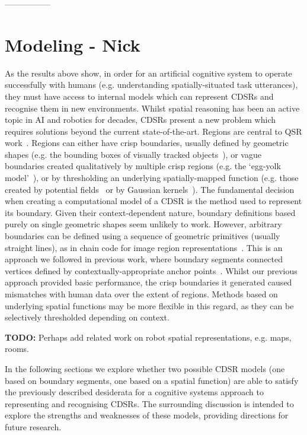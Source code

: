 \documentclass[11pt,letterpaper]{article}
\begin{document}
-----------------
 




\section{Modeling - Nick}


As the results above show, in order for an artificial cognitive system to operate successfully with humans (e.g. understanding spatially-situated task utterances), they must have access to internal models which can represent CDSRs and recognise them in new environments. Whilst spatial reasoning has been an active topic in AI and robotics for decades, CDSRs present a new problem which requires solutions beyond the current state-of-the-art. Regions are central to QSR work~\cite{Cohn:2001}. Regions can either have crisp boundaries, usually defined by geometric shapes (e.g. the bounding boxes of visually tracked objects~\cite{SridharCohn:10}), or vague boundaries created qualitatively by multiple crisp regions (e.g. the `egg-yolk model'~\cite{Cohn96b}), or by thresholding an underlying spatially-mapped function (e.g. those created by potential fields~\cite{brenneretal07ijcai} or by Gaussian kernels~\cite{burbridge-dearden12}). The fundamental decision when creating a computational model of a CDSR is the method used to represent its boundary. Given their context-dependent nature, boundary definitions based purely on single geometric shapes seem unlikely to work. However, arbitrary boundaries can be defined using a sequence of geometric primitives (usually straight lines), as in chain code for image region representations~\cite{Freeman:1961}. This is an approach we followed in previous work, where boundary segments connected vertices defined by contextually-appropriate anchor points~\cite{Hawes:2012}.  Whilst our previous approach provided basic performance, the crisp boundaries it generated caused mismatches with human data over the extent of regions. Methods based on underlying spatial functions may be more flexible in this regard, as they can be selectively thresholded depending on context. 


\textbf{TODO:} Perhaps add related work on robot spatial representations, e.g. maps, rooms.  

In the following sections we explore whether two possible CDSR models (one based on boundary segments, one based on a spatial function) are able to satisfy the previously described desiderata for a cognitive systems approach to representing and recognising CDSRs. The surrounding discussion is intended to explore the strengths and weaknesses of these models, providing directions for future research.
\end{document}
